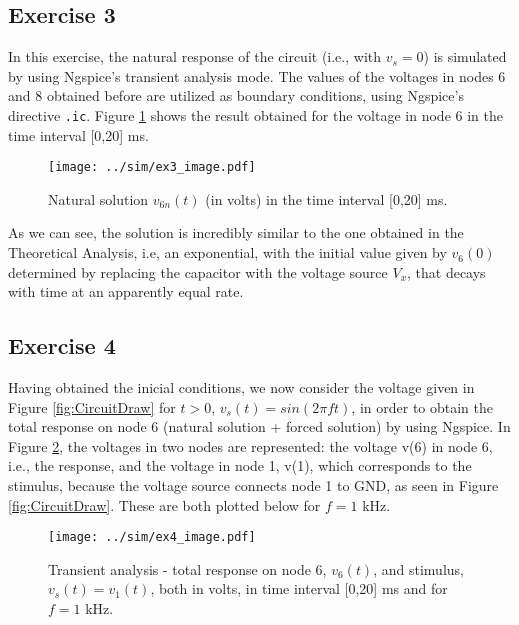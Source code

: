 \subsection{Exercise 3} \label{sec:Ex3Sim}

In this exercise, the natural response of the circuit (i.e., with $v_s=0$) is simulated by using Ngspice's transient analysis mode. The values of the voltages in nodes 6 and 8 obtained before are utilized as boundary conditions, using Ngspice's directive \texttt{.ic}. Figure \ref{fig:Ex3_Image} shows the result obtained for the voltage in node 6 in the time interval [0,20] ms.

\vspace{-34mm}

\begin{figure}[H]
  \centering
  \small
  \texttt{[image: ../sim/ex3\_image.pdf]}
  \vspace{-4mm}
  \caption{Natural solution $v_{6n}(t)$ (in volts) in the time interval [0,20] ms.}
  \label{fig:Ex3_Image}
\end{figure}

\vspace{-6mm}

As we can see, the solution is incredibly similar to the one obtained in the Theoretical Analysis, i.e, an exponential, with the initial value given by $v_6(0)$ determined by replacing the capacitor with the voltage source $V_x$, that decays with time at an apparently equal rate.

\vspace{-4mm}
\subsection{Exercise 4} \label{sec:Ex4Sim}
\vspace{-2mm}
Having obtained the inicial conditions, we now consider the voltage given in Figure \ref{fig:CircuitDraw} for $t>0$, $v_s(t)=sin(2\pi ft)$, in order to obtain the total response on node 6 (natural solution + forced solution) by using Ngspice. In Figure \ref{fig:Ex4_Image}, the voltages in two nodes are represented: the voltage v(6) in node 6, i.e., the response, and the voltage in node 1, v(1), which corresponds to the stimulus, because the voltage source connects node 1 to GND, as seen in Figure \ref{fig:CircuitDraw}. These are both plotted below for $f=1$ kHz.

\vspace{-35mm}
\begin{figure}[H]
  \centering
  \texttt{[image: ../sim/ex4\_image.pdf]}
  \vspace{-5mm}
  \caption{Transient analysis - total response on node 6, $v_6(t)$, and stimulus, $v_s(t)=v_1(t)$, both in volts, in time interval [0,20] ms and for $f=1$ kHz.}
  \label{fig:Ex4_Image}
\end{figure}


